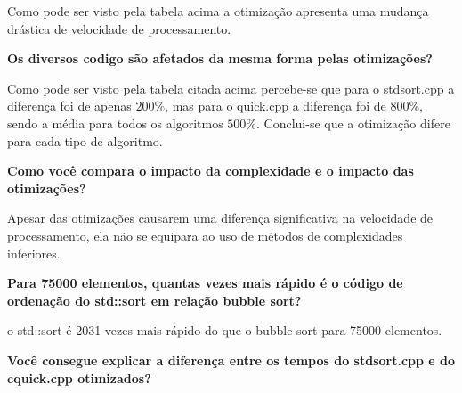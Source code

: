 \documentclass[a4paper, 12pt]{article}
\begin{document}
Como pode ser visto pela tabela acima a otimização apresenta uma mudança drástica de velocidade de processamento.

\textbf{Os diversos codigo são afetados da mesma forma pelas 
otimizações?}

Como pode ser visto pela tabela citada acima percebe-se que para o stdsort.cpp a diferença foi de apenas $200\%$, mas para o quick.cpp a diferença foi de $800\%$, sendo a média para todos os algoritmos $500\%$. Conclui-se que a otimização difere para cada tipo de algoritmo.

\textbf{Como você compara o impacto da complexidade e o impacto das otimizações?}

Apesar das otimizações causarem uma diferença significativa na velocidade de processamento, ela não se equipara ao uso de métodos de complexidades inferiores.

\textbf{Para 75000 elementos, quantas vezes mais rápido é o código de ordenação do std::sort em relação bubble sort?}
 
o std::sort é 2031 vezes mais rápido do que o bubble sort para 75000 elementos. 

\textbf{Você consegue explicar a diferença entre os tempos do stdsort.cpp e do cquick.cpp otimizados?}



\begin{table}[H] %
	\begin{center}
	\end{center}
	\caption{}
\end{table}
\end{document}
